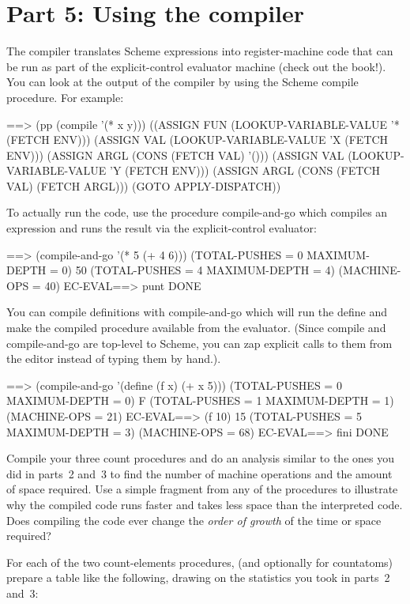 \section{Part 5: Using the compiler}

The compiler translates {\sc Scheme} expressions into register-machine code
that can be run as part of the explicit-control evaluator machine
(check out the book!). You can look at the output of the compiler by
using the {\sc Scheme} {\cf compile} procedure. For example:

\beginlisp
==> (pp (compile '(* x y)))
((ASSIGN FUN (LOOKUP-VARIABLE-VALUE '* (FETCH ENV)))
 (ASSIGN VAL (LOOKUP-VARIABLE-VALUE 'X (FETCH ENV)))
 (ASSIGN ARGL (CONS (FETCH VAL) '()))
 (ASSIGN VAL (LOOKUP-VARIABLE-VALUE 'Y (FETCH ENV)))
 (ASSIGN ARGL (CONS (FETCH VAL) (FETCH ARGL)))
 (GOTO APPLY-DISPATCH))
\endlisp

To actually run the code, use the procedure {\cf compile-and-go} which
compiles an expression and runs the result via the explicit-control
evaluator:

\beginlisp
==> (compile-and-go '(* 5 (+ 4 6)))
(TOTAL-PUSHES = 0 MAXIMUM-DEPTH = 0)
50
(TOTAL-PUSHES = 4 MAXIMUM-DEPTH = 4)
(MACHINE-OPS = 40)
\null
EC-EVAL==> punt
DONE
\endlisp

You can compile definitions with {\cf compile-and-go} which will run
the {\cf define} and make the compiled procedure available from the
evaluator. (Since {\cf compile} and {\cf compile-and-go} are
top-level to {\sc Scheme}, you can {\cf zap} explicit calls to them from
the editor instead of typing them by hand.).

\beginlisp
==> (compile-and-go '(define (f x) (+ x 5)))
(TOTAL-PUSHES = 0 MAXIMUM-DEPTH = 0)
F
(TOTAL-PUSHES = 1 MAXIMUM-DEPTH = 1)
(MACHINE-OPS = 21)
\null
EC-EVAL==> (f 10)
15
(TOTAL-PUSHES = 5 MAXIMUM-DEPTH = 3)
(MACHINE-OPS = 68)
\null
EC-EVAL==> fini
DONE
\endlisp

 Compile your three {\cf count} procedures and
do an analysis similar to the ones you did in parts~2 and~3 to find
the number of machine operations and the amount of space required.
Use a simple fragment from any of the procedures to illustrate why the
compiled code runs faster and takes less space than the interpreted
code.  Does compiling the code ever change the {\em order of growth}
of the time or space required?

 For each of the two {\cf count-elements}
procedures, (and optionally for {\cf countatoms}) prepare a table like
the following, drawing on the statistics you took in parts~2 and~3:

